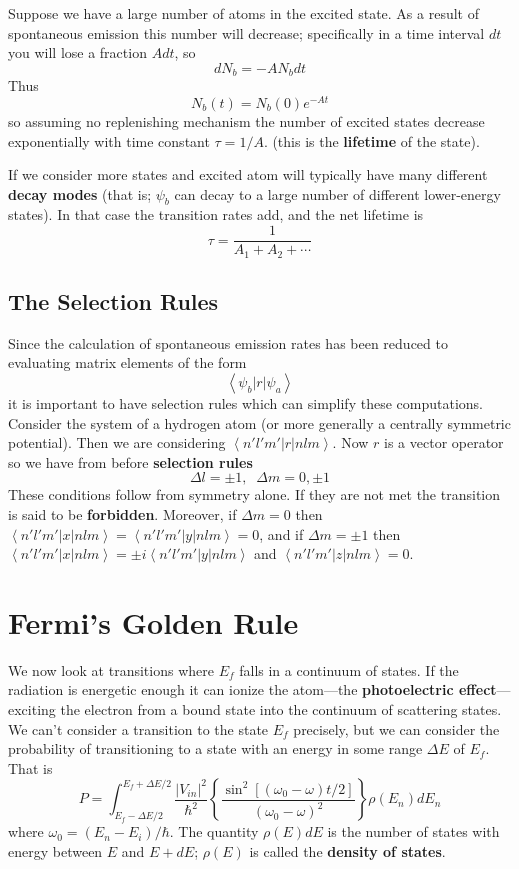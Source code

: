 \documentclass[12pt, a4paper, oneside, openright, titlepage]{book}
\newcommand{\brkt}[1]{\left\langle #1\right\rangle}
\begin{document}
Suppose we have a large number of atoms in the excited state. As a result of spontaneous emission this number will decrease; specifically in a time interval $dt$ you will lose a fraction $Adt$, so $$dN_b = -AN_bdt$$
Thus $$N_b(t) = N_b(0)e^{-At}$$
so assuming no replenishing mechanism the number of excited states decrease exponentially with time constant $\tau = 1/A$. (this is the \textbf{lifetime} of the state).

If we consider more states and excited atom will typically have many different \textbf{decay modes} (that is; $\psi_b$ can decay to a large number of different lower-energy states). In that case the transition rates add, and the net lifetime is $$\tau = \frac{1}{A_1+A_2+\cdots}$$

\subsection{The Selection Rules}

Since the calculation of spontaneous emission rates has been reduced to evaluating matrix elements of the form $$\brkt{\psi_b|r|\psi_a}$$
it is important to have selection rules which can simplify these computations. Consider the system of a hydrogen atom (or more generally a centrally symmetric potential). Then we are considering $\brkt{n'l'm'|r|nlm}$. Now $r$ is a vector operator so we have from before \textbf{selection rules} $$\Delta l = \pm 1,\;\;\Delta m = 0,\pm 1$$
These conditions follow from symmetry alone. If they are not met the transition is said to be \textbf{forbidden}. Moreover, if $\Delta m = 0$ then $\brkt{n'l'm'|x|nlm} = \brkt{n'l'm'|y|nlm} = 0$, and if $\Delta m = \pm 1$ then $\brkt{n'l'm'|x|nlm} = \pm i\brkt{n'l'm'|y|nlm}$ and $\brkt{n'l'm'|z|nlm} = 0$.



\section{Fermi's Golden Rule}

We now look at transitions where $E_f$ falls in a continuum of states. If the radiation is energetic enough it can ionize the atom---the \textbf{photoelectric effect}---exciting the electron from a bound state into the continuum of scattering states. We can't consider a transition to the state $E_f$ precisely, but we can consider the probability of transitioning to a state with an energy in some range $\Delta E$ of $E_f$. That is $$P = \int_{E_f-\Delta E/2}^{E_f+\Delta E/2}\frac{|V_{in}|^2}{\hbar^2}\left\{\frac{\sin^2[(\omega_0-\omega)t/2]}{(\omega_0-\omega)^2}\right\}\rho(E_n)dE_n$$
where $\omega_0 = (E_n-E_i)/\hbar$. The quantity $\rho(E)dE$ is the number of states with energy between $E$ and $E+dE$; $\rho(E)$ is called the \textbf{density of states}.
\end{document}
